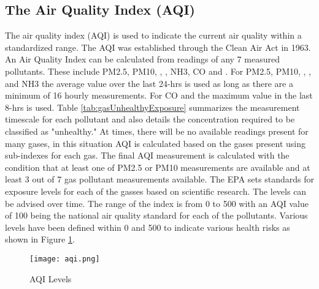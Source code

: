 \subsection{The Air Quality Index (AQI)}
The air quality index (AQI) is used to indicate the current air quality within a standardized range.
The AQI was established through the Clean Air Act in 1963. An Air Quality Index can be calculated
from readings of any 7 measured pollutants. These include PM2.5, PM10, \sdo, \nox, NH3, CO and
\ozone. For PM2.5, PM10, \sdo, \nox, and NH3 the average value over the last 24-hrs is used as long
as there are a minimum of 16 hourly measurements. For CO and \ozone the maximum value in the last
8-hrs is used. Table \ref{tab:gasUnhealthyExposure} summarizes the measurement timescale for each
pollutant and also details the concentration required to be classified as "unhealthy." At times,
there will be no available readings present for many gases, in this situation AQI is calculated
based on the gases present using sub-indexes for each gas. The final AQI measurement is calculated
with the condition that at least one of PM2.5 or PM10 measurements are available and at least 3 out
of 7 gas pollutant measurements available. The EPA sets standards for exposure levels for each of
the gasses based on scientific research. The levels can be advised over time. The range of the index
is from 0 to 500 with an AQI value of 100 being the national air quality standard for each of the
pollutants. Various levels have been defined within 0 and 500 to indicate various health risks as
shown in Figure \ref{fig:aqiLevels}. 

\begin{figure}[H]
\centering
\texttt{[image: aqi.png]}
\caption{AQI Levels}
\label{fig:aqiLevels}
\end{figure}
